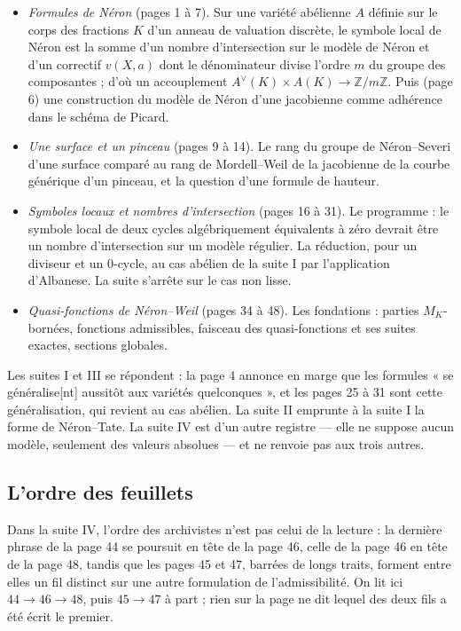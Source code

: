 \documentclass[11pt,a4paper]{article}
\begin{document}
\begin{itemize}
  \item[I.] \emph{Formules de Néron} (pages 1 à 7). Sur une variété
  abélienne $A$ définie sur le corps des fractions $K$ d'un anneau de
  valuation discrète, le symbole local de Néron est la somme d'un nombre
  d'intersection sur le modèle de Néron et d'un correctif $v(X,a)$ dont le
  dénominateur divise l'ordre $m$ du groupe des composantes ; d'où un
  accouplement $A^\vee(K) \times A(K) \to \mathbb{Z}/m\mathbb{Z}$. Puis
  (page 6) une construction du modèle de Néron d'une jacobienne comme
  adhérence dans le schéma de Picard.
  \item[II.] \emph{Une surface et un pinceau} (pages 9 à 14). Le rang du
  groupe de Néron–Severi d'une surface comparé au rang de Mordell–Weil de
  la jacobienne de la courbe générique d'un pinceau, et la question d'une
  formule de hauteur.
  \item[III.] \emph{Symboles locaux et nombres d'intersection} (pages 16 à
  31). Le programme : le symbole local de deux cycles algébriquement
  équivalents à zéro devrait être un nombre d'intersection sur un modèle
  régulier. La réduction, pour un diviseur et un $0$-cycle, au cas
  abélien de la suite I par l'application d'Albanese. La suite s'arrête
  sur le cas non lisse.
  \item[IV.] \emph{Quasi-fonctions de Néron–Weil} (pages 34 à 48). Les
  fondations : parties $M_K$-bornées, fonctions admissibles, faisceau des
  quasi-fonctions et ses suites exactes, sections globales.
\end{itemize}

Les suites I et III se répondent : la page 4 annonce en marge que les
formules « se généralise[nt] aussitôt aux variétés quelconques », et les
pages 25 à 31 sont cette généralisation, qui revient au cas abélien. La
suite II emprunte à la suite I la forme de Néron–Tate. La suite IV est
d'un autre registre — elle ne suppose aucun modèle, seulement des
valeurs absolues — et ne renvoie pas aux trois autres.

\subsection*{L'ordre des feuillets}

Dans la suite IV, l'ordre des archivistes n'est pas celui de la lecture :
la dernière phrase de la page 44 se poursuit en tête de la page 46, celle
de la page 46 en tête de la page 48, tandis que les pages 45 et 47, barrées
de longs traits, forment entre elles un fil distinct sur une autre
formulation de l'admissibilité. On lit ici $44 \to 46 \to 48$, puis
$45 \to 47$ à part ; rien sur la page ne dit lequel des deux fils a été
écrit le premier.
\end{document}
